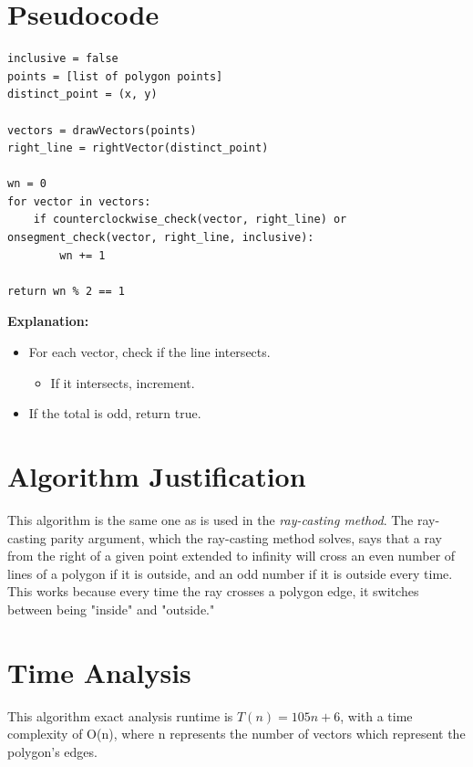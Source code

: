 \documentclass{labReport}
\begin{document}
\begin{multicols*}{2}
\vspace{5em}

\section{Pseudocode}
\begin{verbatim}
inclusive = false
points = [list of polygon points]
distinct_point = (x, y)

vectors = drawVectors(points)
right_line = rightVector(distinct_point)

wn = 0
for vector in vectors:
    if counterclockwise_check(vector, right_line) or onsegment_check(vector, right_line, inclusive):
        wn += 1

return wn % 2 == 1
\end{verbatim}
\textbf{Explanation:}

\begin{itemize}
    \item For each vector, check if the line intersects. 
    \begin{itemize}
        \item If it intersects, increment. 
    \end{itemize}
    \item If the total is odd, return true.
\end{itemize}

\section{Algorithm Justification}
This algorithm is the same one as is used in the \textit{ray-casting method}. The ray-casting parity argument, which the ray-casting method solves, says that a ray from the right of a given point extended to infinity will cross an even number of lines of a polygon if it is outside, and an odd number if it is outside every time. This works because every time the ray crosses a polygon edge, it switches between being "inside" and "outside."

\section{Time Analysis}
This algorithm exact analysis runtime is $T(n) = 105n + 6$, with a time complexity of O(n), where n represents the number of vectors which represent the polygon's edges.


\end{multicols*}
\end{document}
